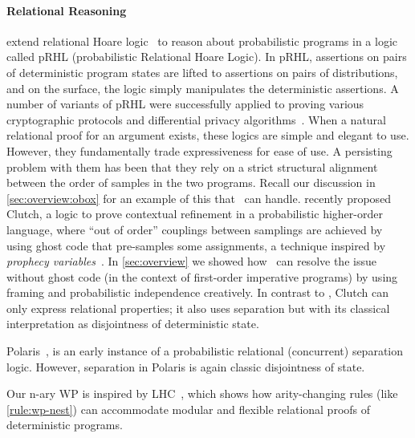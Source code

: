 \documentclass[acmsmall,nonacm,screen,appendix]{acmart}
\begin{document}
\paragraph{\bfseries Relational Reasoning}
\citet{barthe2009formal} extend relational Hoare logic~\cite{benton2004simple} to reason about probabilistic programs in a logic called pRHL (probabilistic Relational Hoare Logic).
In pRHL, assertions on pairs of deterministic program states are lifted to assertions on pairs of distributions, and on the surface, the logic simply manipulates the deterministic assertions.
A number of variants of pRHL were successfully applied to proving various cryptographic protocols and differential privacy algorithms~\cite{barthe2009formal,barthe2015coupling,hsu2017probabilistic,wang2019proving, zhang2017lightdp}.
When a natural relational proof for an argument exists, these logics are simple and elegant to use. However, they fundamentally
trade expressiveness for ease of use.
A persisting problem with them has been that they rely on a strict structural alignment between the order of samples in the two programs. Recall our discussion in \cref{sec:overview:obox} for an example of this that \thelogic\ can handle.
\citet{gregersen2023asynchronous} recently proposed Clutch,
a logic to prove contextual refinement in a probabilistic higher-order language,
where ``out of order'' couplings between samplings are achieved by
using ghost code that pre-samples some assignments,
a technique inspired by \emph{prophecy variables}~\cite{jung2019future}.
In \cref{sec:overview} we showed how \thelogic\ can resolve the issue
without ghost code
(in the context of first-order imperative programs) by using framing and probabilistic independence creatively.
In contrast to \thelogic, Clutch can only express relational properties;
it also uses separation but with its classical interpretation as disjointness
of deterministic state.

Polaris~\cite{tassarotti2019polaris}, is an early instance of a probabilistic relational (concurrent) separation logic.
However, separation in Polaris is again classic disjointness of state.


Our \pre n-ary WP is inspired by LHC~\cite{d2022proving},
which shows how arity-changing rules (like \ref{rule:wp-nest})
can accommodate modular and flexible relational proofs of deterministic programs.
\end{document}
